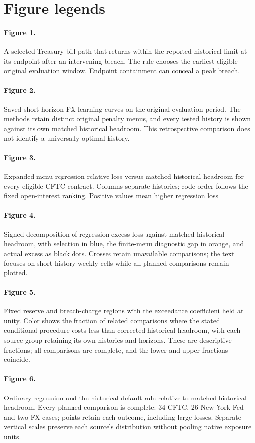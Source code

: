 \section*{Figure legends}
\paragraph{Figure 1.} A selected Treasury-bill path that returns within the reported historical limit at its endpoint after an intervening breach. The rule chooses the earliest eligible original evaluation window. Endpoint containment can conceal a peak breach.

\paragraph{Figure 2.} Saved short-horizon FX learning curves on the original evaluation period. The methods retain distinct original penalty menus, and every tested history is shown against its own matched historical headroom. This retrospective comparison does not identify a universally optimal history.

\paragraph{Figure 3.} Expanded-menu regression relative loss versus matched historical headroom for every eligible CFTC contract. Columns separate histories; code order follows the fixed open-interest ranking. Positive values mean higher regression loss.

\paragraph{Figure 4.} Signed decomposition of regression excess loss against matched historical headroom, with selection in blue, the finite-menu diagnostic gap in orange, and actual excess as black dots. Crosses retain unavailable comparisons; the text focuses on short-history weekly cells while all planned comparisons remain plotted.

\paragraph{Figure 5.} Fixed reserve and breach-charge regions with the exceedance coefficient held at unity. Color shows the fraction of related comparisons where the stated conditional procedure costs less than corrected historical headroom, with each source group retaining its own histories and horizons. These are descriptive fractions; all comparisons are complete, and the lower and upper fractions coincide.

\paragraph{Figure 6.} Ordinary regression and the historical default rule relative to matched historical headroom. Every planned comparison is complete: 34 CFTC, 26 New York Fed and two FX cases; points retain each outcome, including large losses. Separate vertical scales preserve each source's distribution without pooling native exposure units.
